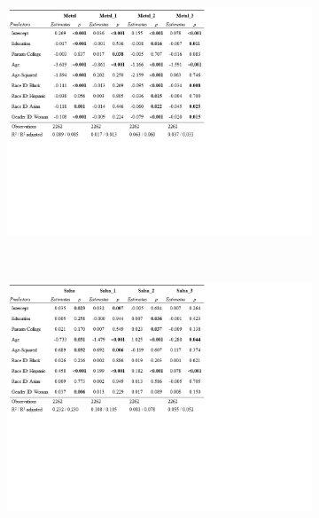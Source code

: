 \documentclass[a4paper,12pt]{extarticle}
\begin{document}
\begin{figure}[ht!]
    \centering    
     \begin{subfigure}[b]{0.9\textwidth}
        \includegraphics[trim={0 10cm 7cm 0},clip, width=1.0\textwidth]{Tabs/reg-tab-metal.png}
        \caption{}
        \label{tab:reg-metal}
    \end{subfigure} \\
     \begin{subfigure}[b]{0.9\textwidth}
        \includegraphics[trim={0 10cm 7cm 0},clip, width=1.0\textwidth]{Tabs/reg-tab-salsa.png}
        \caption{}
        \label{tab:reg-latin}
    \end{subfigure}
\end{figure}
    
\end{document}
